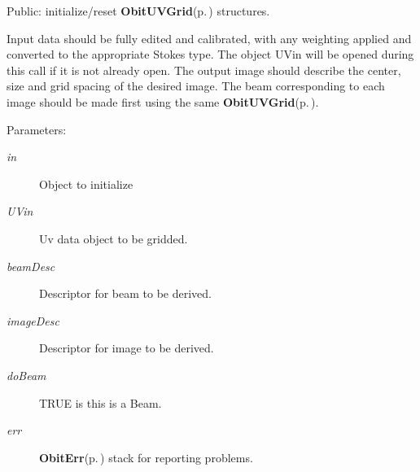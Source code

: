 Public: initialize/reset {\bf Obit\-UVGrid}{\rm (p.\,\pageref{structObitUVGrid})} structures. 

Input data should be fully edited and calibrated, with any weighting applied and converted to the appropriate Stokes type. The object UVin will be opened during this call if it is not already open. The output image should describe the center, size and grid spacing of the desired image. The beam corresponding to each image should be made first using the same {\bf Obit\-UVGrid}{\rm (p.\,\pageref{structObitUVGrid})}. \begin{Desc}
\item[Parameters:]
\begin{description}
\item[{\em in}]Object to initialize \item[{\em UVin}]Uv data object to be gridded. \item[{\em beam\-Desc}]Descriptor for beam to be derived. \item[{\em image\-Desc}]Descriptor for image to be derived. \item[{\em do\-Beam}]TRUE is this is a Beam. \item[{\em err}]{\bf Obit\-Err}{\rm (p.\,\pageref{structObitErr})} stack for reporting problems. \end{description}
\end{Desc}
